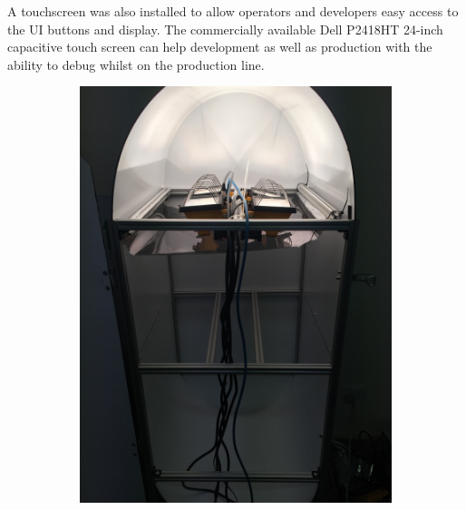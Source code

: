 \documentclass[fleqn,twoside]{article}
\begin{document}
A touchscreen was also installed to allow operators and developers easy access to the UI buttons and display. The commercially available Dell \textcopyright P2418HT 24-inch capacitive touch screen can help development as well as production with the ability to debug whilst on the production line.


\begin{figure}[h]
	\centering
	\begin{subfigure}{.35\textwidth}
		\centering
		\includegraphics[width=.9\linewidth,angle=270,origin=c]{bench_hal_film.jpg}
		\caption{}
		\label{fig:bench_hal_film}
	\end{subfigure}%
	\begin{subfigure}{.35\textwidth}
		\centering

\end{subfigure}
\end{figure}
\end{document}
